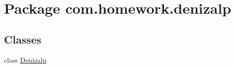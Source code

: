 \hypertarget{namespacecom_1_1homework_1_1denizalp}{}\section{Package com.\+homework.\+denizalp}
\label{namespacecom_1_1homework_1_1denizalp}
\subsection*{Classes}
\begin{DoxyCompactItemize}
\item 
class \hyperlink{classcom_1_1homework_1_1denizalp_1_1_denizalp}{Denizalp}
\end{DoxyCompactItemize}
